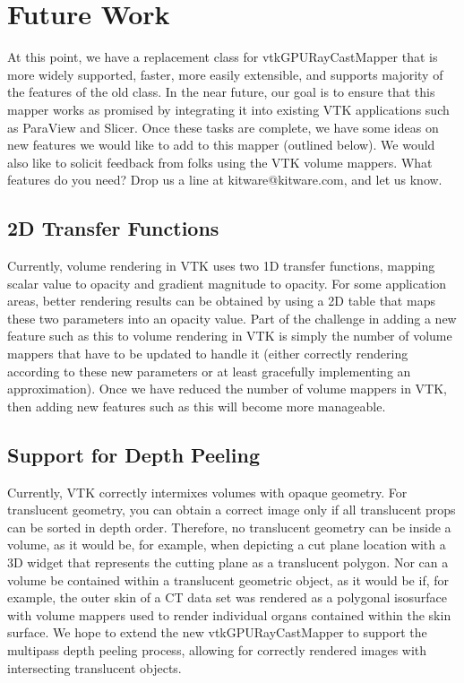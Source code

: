 \section{Future Work}
\label{future-work}
At this point, we have a replacement class for vtkGPURayCastMapper that is more
widely supported, faster, more easily extensible, and supports majority of the
features of the old class. In the near future, our goal is to ensure that this
mapper works as promised by integrating it into existing VTK applications such
as ParaView and Slicer. Once these tasks are complete, we have some ideas on new
features we would like to add to this mapper (outlined below). We would also
like to solicit feedback from folks using the VTK volume mappers. What features
do you need? Drop us a line at kitware@kitware.com, and let us know.

\subsection{2D Transfer Functions}
\label{2d-transfer-functions}
Currently, volume rendering in VTK uses two 1D transfer functions, mapping
scalar value to opacity and gradient magnitude to opacity. For some application
areas, better rendering results can be obtained by using a 2D table that maps
these two parameters into an opacity value. Part of the challenge in adding a
new feature such as this to volume rendering in VTK is simply the number of
volume mappers that have to be updated to handle it (either correctly rendering
according to these new parameters or at least gracefully implementing an
approximation). Once we
have reduced the number of volume mappers in VTK, then adding new features such
as this will become more manageable.

\subsection{Support for Depth Peeling}
\label{support-for-depth-peeling}
Currently, VTK correctly intermixes volumes with opaque geometry. For
translucent geometry, you can obtain a correct image only if all translucent
props can be sorted in depth order. Therefore, no translucent geometry can be
inside a volume, as it would be, for example, when depicting a cut plane
location with a 3D widget that represents the cutting plane as a translucent
polygon.  Nor can a volume be contained within a translucent geometric object,
as it would be if, for example, the outer skin of a CT data set was rendered
as a polygonal isosurface with volume mappers used to render individual organs
contained within the skin surface. We hope to extend the new
vtkGPURayCastMapper to support the multipass depth peeling process, allowing
for correctly rendered images with intersecting translucent objects.


